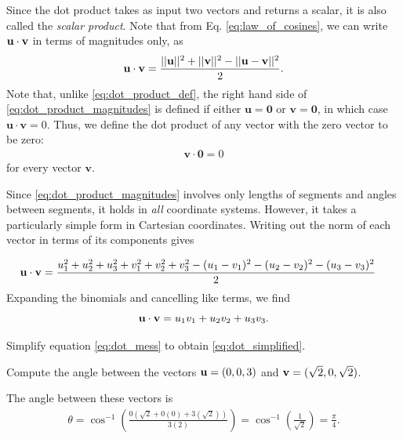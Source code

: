 \documentclass[12pt,letterpaper,reqno]{article}
\numberwithin{equation}{section}
\begin{document}
Since the dot product takes as input two vectors and returns a scalar, it is also called the \emph{scalar product}. Note that from Eq. \eqref{eq:law_of_cosines}, we can write ${\bf u}\cdot {\bf v}$ in terms of magnitudes only, as 
\begin{equation}\label{eq:dot_product_magnitudes}
	{\bf u}\cdot {\bf v}=\frac{||{\bf u}||^2+||{\bf v}||^2-||{\bf u}-{\bf v}||^2}{2}.
\end{equation}
Note that, unlike \eqref{eq:dot_product_def}, the right hand side of \eqref{eq:dot_product_magnitudes} is defined if either $\mathbf{u}=\mathbf{0}$ or $\mathbf{v}=\mathbf{0}$, in which case $\mathbf{u}\cdot \mathbf{v}=0$. Thus, we define the dot product of any vector with the zero vector to be zero:
\begin{align}
	\mathbf{v}\cdot \mathbf{0}=0
\end{align}
for every vector $\mathbf{v}$.

Since \eqref{eq:dot_product_magnitudes} involves only lengths of segments and angles between segments, it holds in \emph{all} coordinate systems. However, it takes a particularly simple form in Cartesian coordinates. Writing out the norm of each vector in terms of its components gives

\begin{align}\label{eq:dot_mess}
	{\bf u}\cdot {\bf v}&=\frac{u_1^2+u_2^2+u_3^2+v_1^2+v_2^2+v_3^2-(u_1-v_1)^2-(u_2-v_2)^2-(u_3-v_3)^2}{2}
\end{align}
Expanding the binomials and cancelling like terms, we find
\begin{equation}\label{eq:dot_simplified}
	{\bf u}\cdot {\bf v}=u_1v_1+u_2v_2+u_3v_3.
\end{equation}

\begin{exercise} 
Simplify equation \eqref{eq:dot_mess} to obtain \eqref{eq:dot_simplified}. 	
\end{exercise}


\begin{example}
Compute the angle between the vectors ${\bf u}=(0,0,3)$ and ${\bf v}=(\sqrt{2},0,\sqrt{2})$.	
\end{example}

{\color{red}  The angle between these vectors is
\begin{align*}
	\theta=\cos^{-1}\left(\frac{0(\sqrt{2}+0(0)+3(\sqrt{2}))}{3(2)}\right)=\cos^{-1}\left(\frac{1}{\sqrt{2}}\right)=\frac{\pi}{4}.
\end{align*}}
\end{document}
